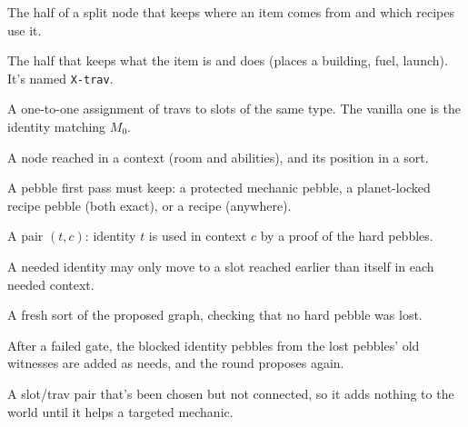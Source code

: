 \begin{description}[leftmargin=1.2em, style=nextline]
  \item[Slot / position] The half of a split node that keeps where an item comes from and which recipes use it.
  \item[Trav / identity] The half that keeps what the item is and does (places a building, fuel, launch). It's named \texttt{X-trav}.
  \item[Matching] A one-to-one assignment of travs to slots of the same type. The vanilla one is the identity matching $M_0$.
  \item[Pebble, rank] A node reached in a context (room and abilities), and its position in a sort.
  \item[Hard pebble] A pebble first pass must keep: a protected mechanic pebble, a planet-locked recipe pebble (both exact), or a recipe (anywhere).
  \item[Need] A pair $(t, c)$: identity $t$ is used in context $c$ by a proof of the hard pebbles.
  \item[Rank rule] A needed identity may only move to a slot reached earlier than itself in each needed context.
  \item[Gate] A fresh sort of the proposed graph, checking that no hard pebble was lost.
  \item[Refinement] After a failed gate, the blocked identity pebbles from the lost pebbles' old witnesses are added as needs, and the round proposes again.
  \item[Reservation (greedy only)] A slot/trav pair that's been chosen but not connected, so it adds nothing to the world until it helps a targeted mechanic.
\end{description}

